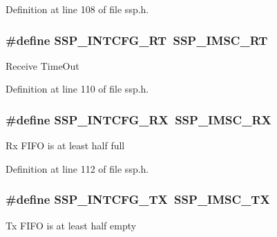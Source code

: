 Definition at line 108 of file ssp.\+h.

\subsubsection[{\texorpdfstring{S\+S\+P\+\_\+\+I\+N\+T\+C\+F\+G\+\_\+\+RT}{SSP_INTCFG_RT}}]{\setlength{\rightskip}{0pt plus 5cm}\#define S\+S\+P\+\_\+\+I\+N\+T\+C\+F\+G\+\_\+\+RT~{\bf S\+S\+P\+\_\+\+I\+M\+S\+C\+\_\+\+RT}}\hypertarget{group___s_s_p___public___macros_ga4716c2b633cc0698f6e515ffb7abedbd}{}\label{group___s_s_p___public___macros_ga4716c2b633cc0698f6e515ffb7abedbd}
Receive Time\+Out 

Definition at line 110 of file ssp.\+h.

\subsubsection[{\texorpdfstring{S\+S\+P\+\_\+\+I\+N\+T\+C\+F\+G\+\_\+\+RX}{SSP_INTCFG_RX}}]{\setlength{\rightskip}{0pt plus 5cm}\#define S\+S\+P\+\_\+\+I\+N\+T\+C\+F\+G\+\_\+\+RX~{\bf S\+S\+P\+\_\+\+I\+M\+S\+C\+\_\+\+RX}}\hypertarget{group___s_s_p___public___macros_ga20c9695e3dde083db7f54d6715c5573c}{}\label{group___s_s_p___public___macros_ga20c9695e3dde083db7f54d6715c5573c}
Rx F\+I\+FO is at least half full 

Definition at line 112 of file ssp.\+h.

\subsubsection[{\texorpdfstring{S\+S\+P\+\_\+\+I\+N\+T\+C\+F\+G\+\_\+\+TX}{SSP_INTCFG_TX}}]{\setlength{\rightskip}{0pt plus 5cm}\#define S\+S\+P\+\_\+\+I\+N\+T\+C\+F\+G\+\_\+\+TX~{\bf S\+S\+P\+\_\+\+I\+M\+S\+C\+\_\+\+TX}}\hypertarget{group___s_s_p___public___macros_ga12314c10c13b5663431e2f3d794d8e6d}{}\label{group___s_s_p___public___macros_ga12314c10c13b5663431e2f3d794d8e6d}
Tx F\+I\+FO is at least half empty 

